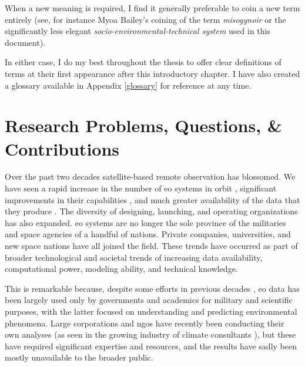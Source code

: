 When a new meaning is required, I find it generally preferable to coin a new term entirely (see, for instance Myoa Bailey's coining of the term \textit{misogynoir} \cite{baileyMoreOriginMisogynoir} or the significantly less elegant \textit{socio-environmental-technical system} used in this document).

In either case, I do my best throughout the thesis to offer clear definitions of terms at their first appearance after this introductory chapter. I have also created a glossary available in Appendix \ref{glossary} for reference at any time. 

\section{Research Problems, Questions, \& Contributions} \label{sec:questions}

Over the past two decades satellite-based remote observation has blossomed. We have seen a rapid increase in the number of \ac{eo} systems in orbit \cite{belwardWhoLaunchedWhat2015}, significant improvements in their capabilities \cite{jensenRemoteSensingEnvironment2006}, and much greater availability of the data that they produce \cite{borowitzOpenSpaceGlobal2017}. The diversity of designing, launching, and operating organizations has also expanded. \ac{eo} systems are no longer the sole province of the militaries and space agencies of a handful of nations. Private companies, universities, and new space nations have all joined the field. These trends have occurred as part of broader technological and societal trends of increasing data availability, computational power, modeling ability, and technical knowledge. 

This is remarkable because, despite some efforts in previous decades \cite{lightWarfareWelfareDefense2005}, \ac{eo} data has been largely used only by governments and academics for military and scientific purposes, with the latter focused on understanding and predicting environmental phenomena. Large corporations and \acp{ngo} have recently been conducting their own analyses (as seen in the growing industry of climate consultants \cite{cohenTop10Climate2011}), but these have required significant expertise and resources, and the results have sadly been mostly unavailable to the broader public.

